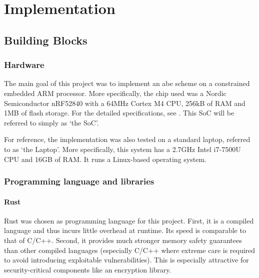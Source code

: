 \chapter{Implementation}

\section{Building Blocks} %

\subsection{Hardware}

The main goal of this project was to implement an \acrshort{abe} scheme on a constrained embedded ARM processor.
More specifically, the chip used was a Nordic Semiconductor nRF52840 with a 64MHz Cortex M4 CPU, 256kB of RAM and 1MB of flash storage.
For the detailed specifications, see \cite{noauthor_nrf52840_nodate}.
This SoC will be referred to simply as `the SoC'.

For reference, the implementation was also tested on a standard laptop, referred to as `the Laptop'.
More specifically, this system has a 2.7GHz Intel i7-7500U CPU and 16GB of RAM.
It runs a Linux-based operating system.


\subsection{Programming language and libraries}

\subsubsection{Rust}

Rust was chosen as programming language for this project.
First, it is a compiled language and thus incurs little overhead at runtime. Its speed is comparable to that of C/C++. %
Second, it provides much stronger memory safety guarantees than other compiled languages (especially C/C++ where extreme care is required to avoid introducing exploitable vulnerabilities).
This is especially attractive for security-critical components like an encryption library.

